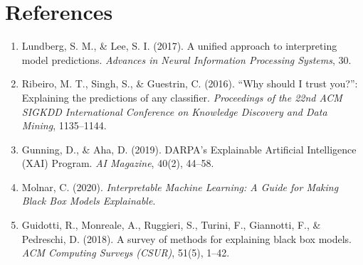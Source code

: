 \documentclass[12pt, a4paper]{article}
\begin{document}
\newpage

\section*{References}

\begin{enumerate}
    \item Lundberg, S. M., \& Lee, S. I. (2017). A unified approach to interpreting model predictions. \textit{Advances in Neural Information Processing Systems}, 30.
    \item Ribeiro, M. T., Singh, S., \& Guestrin, C. (2016). ``Why should I trust you?'': Explaining the predictions of any classifier. \textit{Proceedings of the 22nd ACM SIGKDD International Conference on Knowledge Discovery and Data Mining}, 1135--1144.
    \item Gunning, D., \& Aha, D. (2019). DARPA’s Explainable Artificial Intelligence (XAI) Program. \textit{AI Magazine}, 40(2), 44--58.
    \item Molnar, C. (2020). \textit{Interpretable Machine Learning: A Guide for Making Black Box Models Explainable}.
    \item Guidotti, R., Monreale, A., Ruggieri, S., Turini, F., Giannotti, F., \& Pedreschi, D. (2018). A survey of methods for explaining black box models. \textit{ACM Computing Surveys (CSUR)}, 51(5), 1--42.
\end{enumerate}
\end{document}

